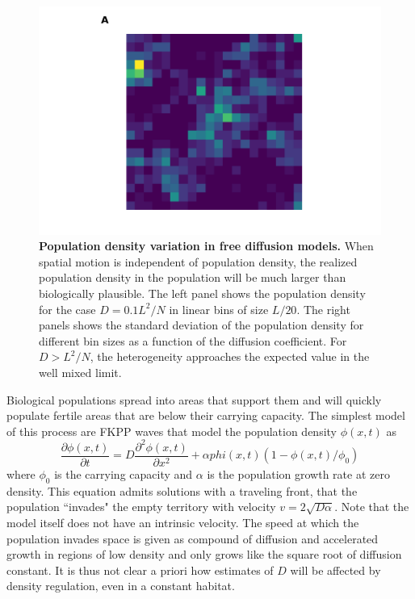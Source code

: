 \documentclass[aps,rmp, onecolumn]{revtex4}
\begin{document}
\begin{figure}
    \includegraphics*[width=\textwidth]{figures/heterogeneity_free_diffusion.pdf}
    \caption[short]{\label{fig:heterogeneity}{\bf Population density variation in free diffusion models.}
    When spatial motion is independent of population density, the realized population density in the population will be much larger than biologically plausible. The left panel shows the population density for the case $D = 0.1 L^2/N$ in linear bins of size $L/20$. The right panels shows the standard deviation of the population density for different bin sizes as a function of the diffusion coefficient. For $D>L^2/N$, the heterogeneity approaches the expected value in the well mixed limit. }
\end{figure}

Biological populations spread into areas that support them and will quickly populate fertile areas that are below their carrying capacity.
The simplest model of this process are FKPP waves that model the population density $\phi(x,t)$ as \citep{fisher_wave_1937,KPP1937,hallatschek_life_2010}
\begin{equation}
    \frac{\partial \phi(x,t)}{\partial t} = D\frac{\partial^2 \phi(x,t)}{\partial x^2} + \alpha phi(x,t)(1-\phi(x,t)/\phi_0)
\end{equation}
where $\phi_0$ is the carrying capacity and $\alpha$ is the population growth rate at zero density.
This equation admits solutions with a traveling front, that the population ``invades" the empty territory with velocity $v = 2\sqrt{D \alpha}$.
Note that the model itself does not have an intrinsic velocity.
The speed at which the population invades space is given as compound of diffusion and accelerated growth in regions of low density and only grows like the square root of diffusion constant.
It is thus not clear a priori how estimates of $D$ will be affected by density regulation, even in a constant habitat.
\end{document}
